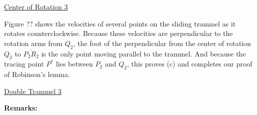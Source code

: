 \documentclass{ximera}
\begin{document}
\begin{onlineOnly}
    \begin{center}
\end{center}
\end{onlineOnly}

\href{https://www.desmos.com/calculator/hi6ug11jbn}{Center of Rotation 3}

Figure ?? shows the velocities of several points on the sliding trammel as it rotates counterclockwise. Because these velocities are perpendicular to the rotation arms from $Q_2$, the foot of the perpendicular from the center of rotation $Q_2$ to $\overline{P_2R_2}$ is the only point moving parallel to the trammel. And because the tracing point $P^*$ lies between $P_2$ and $Q_2$, this proves (c) and completes our proof of Robinson's lemma.



\begin{onlineOnly}
    \begin{center}
\end{center}
\end{onlineOnly}

\href{https://www.desmos.com/calculator/nnmsmjmmnu}{Double Trammel 3}


{\bf Remarks:}
\end{document}
